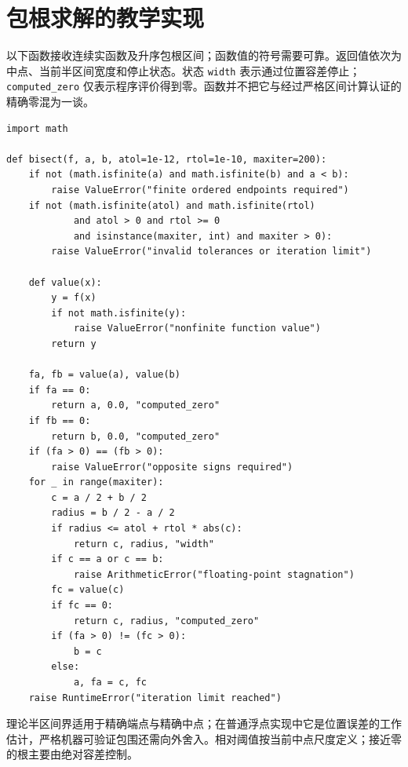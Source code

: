 \section{包根求解的教学实现}
以下函数接收连续实函数及升序包根区间；函数值的符号需要可靠。返回值依次为中点、当前半区间宽度和停止状态。状态 \texttt{width} 表示通过位置容差停止；\texttt{computed\_zero} 仅表示程序评价得到零。函数并不把它与经过严格区间计算认证的精确零混为一谈。
\begin{verbatim}
import math

def bisect(f, a, b, atol=1e-12, rtol=1e-10, maxiter=200):
    if not (math.isfinite(a) and math.isfinite(b) and a < b):
        raise ValueError("finite ordered endpoints required")
    if not (math.isfinite(atol) and math.isfinite(rtol)
            and atol > 0 and rtol >= 0
            and isinstance(maxiter, int) and maxiter > 0):
        raise ValueError("invalid tolerances or iteration limit")

    def value(x):
        y = f(x)
        if not math.isfinite(y):
            raise ValueError("nonfinite function value")
        return y

    fa, fb = value(a), value(b)
    if fa == 0:
        return a, 0.0, "computed_zero"
    if fb == 0:
        return b, 0.0, "computed_zero"
    if (fa > 0) == (fb > 0):
        raise ValueError("opposite signs required")
    for _ in range(maxiter):
        c = a / 2 + b / 2
        radius = b / 2 - a / 2
        if radius <= atol + rtol * abs(c):
            return c, radius, "width"
        if c == a or c == b:
            raise ArithmeticError("floating-point stagnation")
        fc = value(c)
        if fc == 0:
            return c, radius, "computed_zero"
        if (fa > 0) != (fc > 0):
            b = c
        else:
            a, fa = c, fc
    raise RuntimeError("iteration limit reached")
\end{verbatim}
理论半区间界适用于精确端点与精确中点；在普通浮点实现中它是位置误差的工作估计，严格机器可验证包围还需向外舍入。相对阈值按当前中点尺度定义；接近零的根主要由绝对容差控制。

